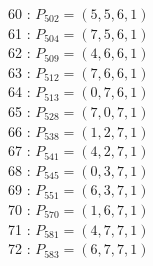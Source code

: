 \documentclass{article}
\begin{document}
{\begin{multicols}{3}
60 : $P_{502}=( 5, 5, 6, 1 )$\\
61 : $P_{504}=( 7, 5, 6, 1 )$\\
62 : $P_{509}=( 4, 6, 6, 1 )$\\
63 : $P_{512}=( 7, 6, 6, 1 )$\\
64 : $P_{513}=( 0, 7, 6, 1 )$\\
65 : $P_{528}=( 7, 0, 7, 1 )$\\
66 : $P_{538}=( 1, 2, 7, 1 )$\\
67 : $P_{541}=( 4, 2, 7, 1 )$\\
68 : $P_{545}=( 0, 3, 7, 1 )$\\
69 : $P_{551}=( 6, 3, 7, 1 )$\\
70 : $P_{570}=( 1, 6, 7, 1 )$\\
71 : $P_{581}=( 4, 7, 7, 1 )$\\
72 : $P_{583}=( 6, 7, 7, 1 )$\\
\end{multicols}


%


%


}%
\end{document}
